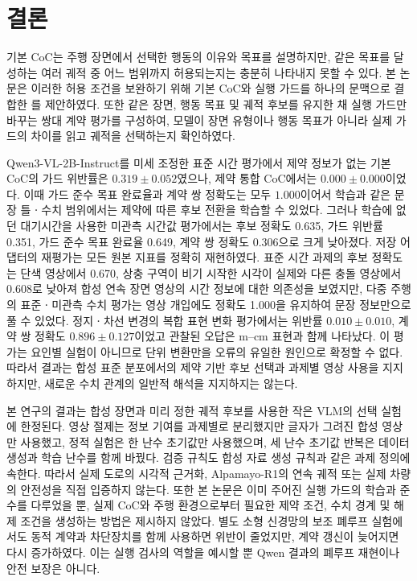 \section{결론}
\label{sec:conclusion}

기본 CoC는 주행 장면에서 선택한 행동의 이유와 목표를 설명하지만, 같은 목표를 달성하는 여러 궤적 중 어느 범위까지 허용되는지는 충분히 나타내지 못할 수 있다. 본 논문은 이러한 허용 조건을 보완하기 위해 기본 CoC와 실행 가드를 하나의 문맥으로 결합한 \sccoc{}를 제안하였다. 또한 같은 장면, 행동 목표 및 궤적 후보를 유지한 채 실행 가드만 바꾸는 쌍대 계약 평가를 구성하여, 모델이 장면 유형이나 행동 목표가 아니라 실제 가드의 차이를 읽고 궤적을 선택하는지 확인하였다.

Qwen3-VL-2B-Instruct를 미세 조정한 표준 시간 평가에서 제약 정보가 없는 기본 CoC의 가드 위반률은 $0.319\pm0.052$였으나, 제약 통합 CoC에서는 $0.000\pm0.000$이었다. 이때 가드 준수 목표 완료율과 계약 쌍 정확도는 모두 $1.000$이어서 학습과 같은 문장 틀ㆍ수치 범위에서는 제약에 따른 후보 전환을 학습할 수 있었다. 그러나 학습에 없던 대기시간을 사용한 미관측 시간값 평가에서는 후보 정확도 0.635, 가드 위반률 0.351, 가드 준수 목표 완료율 0.649, 계약 쌍 정확도 0.306으로 크게 낮아졌다. 저장 어댑터의 재평가는 모든 원본 지표를 정확히 재현하였다. 표준 시간 과제의 후보 정확도는 단색 영상에서 0.670, 상충 구역이 비기 시작한 시각이 실제와 다른 충돌 영상에서 0.608로 낮아져 합성 연속 장면 영상의 시간 정보에 대한 의존성을 보였지만, 다중 주행의 표준ㆍ미관측 수치 평가는 영상 개입에도 정확도 1.000을 유지하여 문장 정보만으로 풀 수 있었다. 정지ㆍ차선 변경의 복합 표현 변화 평가에서는 위반률 $0.010\pm0.010$, 계약 쌍 정확도 $0.896\pm0.127$이었고 관찰된 오답은 m--cm 표현과 함께 나타났다. 이 평가는 요인별 실험이 아니므로 단위 변환만을 오류의 유일한 원인으로 확정할 수 없다. 따라서 결과는 합성 표준 분포에서의 제약 기반 후보 선택과 과제별 영상 사용을 지지하지만, 새로운 수치 관계의 일반적 해석을 지지하지는 않는다.

본 연구의 결과는 합성 장면과 미리 정한 궤적 후보를 사용한 작은 VLM의 선택 실험에 한정된다. 영상 절제는 정보 기여를 과제별로 분리했지만 글자가 그려진 합성 영상만 사용했고, 정적 실험은 한 난수 초기값만 사용했으며, 세 난수 초기값 반복은 데이터 생성과 학습 난수를 함께 바꿨다. 검증 규칙도 합성 자료 생성 규칙과 같은 과제 정의에 속한다. 따라서 실제 도로의 시각적 근거화, Alpamayo-R1의 연속 궤적 또는 실제 차량의 안전성을 직접 입증하지 않는다. 또한 본 논문은 이미 주어진 실행 가드의 학습과 준수를 다루었을 뿐, 실제 CoC와 주행 환경으로부터 필요한 제약 조건, 수치 경계 및 해제 조건을 생성하는 방법은 제시하지 않았다. 별도 소형 신경망의 보조 폐루프 실험에서도 동적 계약과 차단장치를 함께 사용하면 위반이 줄었지만, 계약 갱신이 늦어지면 다시 증가하였다. 이는 실행 검사의 역할을 예시할 뿐 Qwen 결과의 폐루프 재현이나 안전 보장은 아니다.

